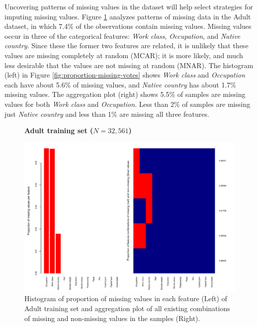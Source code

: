 \documentclass[10pt,twocolumn,letterpaper]{article}
\begin{document}
Uncovering patterns of missing values in the dataset will help select strategies for imputing missing values. Figure \ref{fig:proportion-missing-adult} analyzes patterns of missing data in the Adult dataset, in which 7.4\% of the observations contain missing values. Missing values occur in three of the categorical features: \textit{Work class}, \textit{Occupation}, and \textit{Native country}. Since these the former two features are related, it is unlikely that these values are missing completely at random (MCAR); it is more likely, and much less desirable that the values are not missing at random (MNAR). The histogram (left) in Figure \ref{fig:proportion-missing-votes} shows \textit{Work class} and \textit{Occupation} each have about 5.6\% of missing values, and \textit{Native country} has about 1.7\% missing values. The aggregation plot (right) shows 5.5\% of samples are missing values for both \textit{Work class} and \textit{Occupation}. Less than 2\% of samples are missing just \textit{Native country} and less than 1\% are missing all three features.

\begin{figure}[htbp] 
   \begin{center}
      \textbf{Adult training set ($N=32,561$)}\par\medskip
   \includegraphics[scale=0.5]{figure/proportion-missing-adult.pdf}
  \caption{Histogram of proportion of missing values in each feature (Left) of Adult training set and aggregation plot of all existing combinations of missing and non-missing values in the samples (Right).}
   \label{fig:proportion-missing-adult}
      \end{center}
\end{figure}
\end{document}
